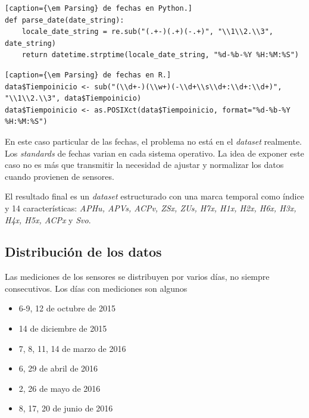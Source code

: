 \documentclass[11pt,spanish,listoffigures,listoftables]{tfgetsinf}
\begin{document}
        \lstset{style=python}
        \begin{lstlisting}[caption={\em Parsing} de fechas en Python.]
def parse_date(date_string):
    locale_date_string = re.sub("(.+-)(.+)(-.+)", "\\1\\2.\\3", date_string)
    return datetime.strptime(locale_date_string, "%d-%b-%Y %H:%M:%S")
        \end{lstlisting}
        
        \begin{lstlisting}[caption={\em Parsing} de fechas en R.]
data$Tiempoinicio <- sub("(\\d+-)(\\w+)(-\\d+\\s\\d+:\\d+:\\d+)", "\\1\\2.\\3", data$Tiempoinicio)
data$Tiempoinicio <- as.POSIXct(data$Tiempoinicio, format="%d-%b-%Y %H:%M:%S")
        \end{lstlisting}
        
        En este caso particular de las fechas, el problema no está en el {\em dataset} realmente. Los {\em standards} de fechas varian en cada sistema operativo. La idea de exponer este caso no es más que transmitir la necesidad de ajustar y normalizar los datos cuando provienen de sensores.
        
        El resultado final es un {\em dataset} estructurado con una marca temporal como índice y 14 características: {\em APHu, APVs, ACPv, ZSx, ZUs, H7x, H1x, H2x, H6x, H3x, H4x, H5x, ACPx} y {\em Svo}.
        
        \subsection{Distribución de los datos}
        
        Las mediciones de los sensores se distribuyen por varios días, no siempre consecutivos. Los días con mediciones son algunos 
        \begin{itemize}
        \item 6-9, 12 de octubre de 2015
        \item 14 de diciembre de 2015
        \item 7, 8, 11, 14 de marzo de 2016
        \item 6, 29 de abril de 2016
        \item 2, 26 de mayo de 2016
        \item 8, 17, 20 de junio de 2016
        \end{itemize}
        
\end{document}
